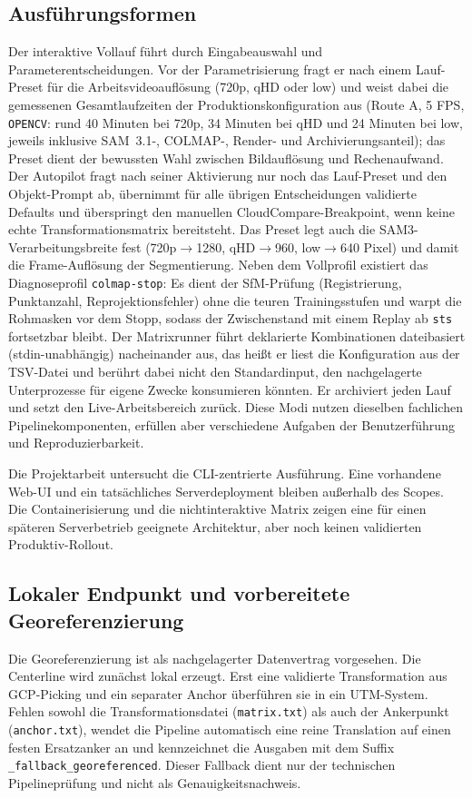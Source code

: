 \subsection{Ausführungsformen}

Der interaktive Vollauf führt durch Eingabeauswahl und Parameterentscheidungen.
Vor der Parametrisierung fragt er nach einem Lauf-Preset für die
Arbeitsvideoauflösung (720p, qHD oder low) und weist dabei die gemessenen
Gesamtlaufzeiten der Produktionskonfiguration aus (Route A, 5 FPS,
\texttt{OPENCV}: rund 40 Minuten bei 720p, 34 Minuten bei qHD und 24 Minuten
bei low, jeweils inklusive SAM~3.1-, COLMAP-, Render- und Archivierungsanteil);
das Preset dient der bewussten Wahl zwischen Bildauflösung und Rechenaufwand.
Der Autopilot fragt nach seiner Aktivierung nur noch das Lauf-Preset und den
Objekt-Prompt ab, übernimmt für alle übrigen Entscheidungen validierte
Defaults und überspringt den manuellen
CloudCompare-Breakpoint, wenn keine echte Transformationsmatrix bereitsteht.
Das Preset legt auch die SAM3-Verarbeitungsbreite fest (720p$\to$1280,
qHD$\to$960, low$\to$640 Pixel) und damit die Frame-Auflösung der
Segmentierung. Neben dem Vollprofil existiert das Diagnoseprofil
\texttt{colmap-stop}: Es dient der SfM-Prüfung (Registrierung, Punktanzahl,
Reprojektionsfehler) ohne die teuren Trainingsstufen und warpt die Rohmasken
vor dem Stopp, sodass der Zwischenstand mit einem Replay ab \texttt{sts}
fortsetzbar bleibt.
Der Matrixrunner führt deklarierte Kombinationen dateibasiert
(stdin-unabhängig) nacheinander aus, das heißt er liest die Konfiguration aus
der TSV-Datei und berührt dabei nicht den Standardinput, den nachgelagerte
Unterprozesse für eigene Zwecke konsumieren könnten. Er archiviert jeden Lauf
und setzt den Live-Arbeitsbereich zurück. Diese Modi nutzen dieselben
fachlichen Pipelinekomponenten, erfüllen aber verschiedene Aufgaben der
Benutzerführung und Reproduzierbarkeit.

Die Projektarbeit untersucht die CLI-zentrierte Ausführung. Eine vorhandene
Web-UI und ein tatsächliches Serverdeployment bleiben außerhalb des Scopes.
Die Containerisierung und die nichtinteraktive Matrix zeigen eine für einen
späteren Serverbetrieb geeignete Architektur, aber noch keinen validierten
Produktiv-Rollout.

\subsection{Lokaler Endpunkt und vorbereitete Georeferenzierung}

Die Georeferenzierung ist als nachgelagerter Datenvertrag vorgesehen. Die
Centerline wird zunächst lokal erzeugt. Erst eine validierte Transformation aus
GCP-Picking und ein separater Anchor überführen sie in ein UTM-System. Fehlen
sowohl die Transformationsdatei (\texttt{matrix.txt}) als auch der
Ankerpunkt (\texttt{anchor.txt}), wendet die Pipeline automatisch eine reine
Translation auf einen festen Ersatzanker an und kennzeichnet die Ausgaben mit
dem Suffix \texttt{\_fallback\_georeferenced}. Dieser Fallback dient nur der
technischen Pipelineprüfung und nicht als Genauigkeitsnachweis.
